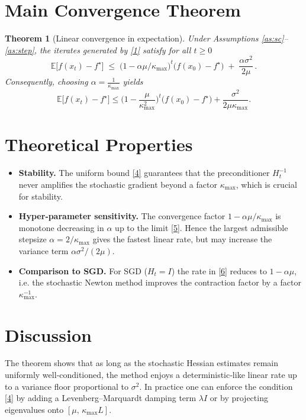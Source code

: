 \documentclass{article}
\newtheorem{theorem}{Theorem}
\newcommand{\E}{\mathbb{E}}
\begin{document}
\section*{Main Convergence Theorem}
\begin{theorem}[Linear convergence in expectation]\label{thm:linear}
Under Assumptions \ref{as:sc}–\ref{as:step}, the iterates generated by \eqref{1} satisfy for all $t\ge 0$
\[
\E\!\big[f(x_t)-f^\star\big]\;\le\;
\big(1-\alpha\mu/\kappa_{\max}\big)^{t}\big(f(x_0)-f^\star\big)
\;+\;
\frac{\alpha\sigma^2}{2\mu}\, .
\tag{6}
\]
Consequently, choosing $\alpha=\frac{1}{\kappa_{\max}}$ yields 
\[
\E\!\big[f(x_t)-f^\star\big]\le
\Big(1-\frac{\mu}{\kappa_{\max}^2}\Big)^{t}\big(f(x_0)-f^\star\big)
+\frac{\sigma^2}{2\mu\kappa_{\max}} .
\]
\end{theorem}

\section*{Theoretical Properties}
\begin{itemize}[leftmargin=*]
\item \textbf{Stability.} The uniform bound \eqref{4} guarantees that the preconditioner $H_t^{-1}$ never amplifies the stochastic gradient beyond a factor $\kappa_{\max}$, which is crucial for stability.
\item \textbf{Hyper‑parameter sensitivity.} The convergence factor $1-\alpha\mu/\kappa_{\max}$ is monotone decreasing in $\alpha$ up to the limit \eqref{5}. Hence the largest admissible stepsize $\alpha=2/\kappa_{\max}$ gives the fastest linear rate, but may increase the variance term $\alpha\sigma^2/(2\mu)$.
\item \textbf{Comparison to SGD.} For SGD ($H_t=I$) the rate in \eqref{6} reduces to $1-\alpha\mu$, i.e. the stochastic Newton method improves the contraction factor by a factor $\kappa_{\max}^{-1}$.
\end{itemize}

\section*{Discussion}
The theorem shows that as long as the stochastic Hessian estimates remain uniformly well‑conditioned, the method enjoys a deterministic‑like linear rate up to a variance floor proportional to $\sigma^2$. In practice one can enforce the condition \eqref{4} by adding a Levenberg–Marquardt damping term $\lambda I$ or by projecting eigenvalues onto $[\mu,\,\kappa_{\max}L]$.
\end{document}
